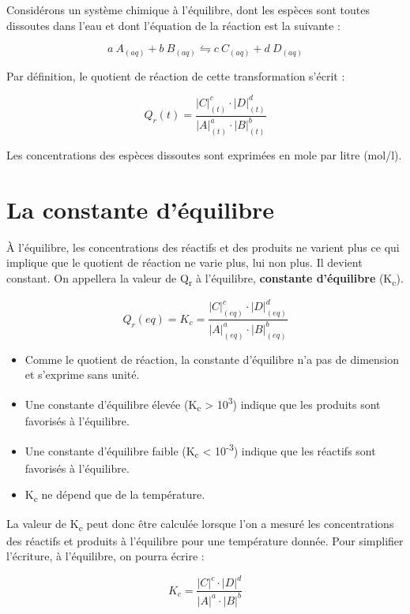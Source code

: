 \documentclass[
  11pt,
  a4paper,
  openany]{book}
\providecommand{\tightlist}{%
  \setlength{\itemsep}{0pt}\setlength{\parskip}{0pt}}
\begin{document}
Considérons un système chimique à l'équilibre, dont les espèces sont toutes dissoutes dans l'eau et dont l'équation de la réaction est la suivante :

\[
  a\ A_{(aq)} + b\ B_{(aq)} \leftrightharpoons c\ C_{(aq)} + d\ D_{(aq)}
\]

Par définition, le quotient de réaction de cette transformation s'écrit :

\[
  Q_{r}(t) = \frac{|C|_{(t)}^{c} \cdot |D|_{(t)}^{d}}{|A|_{(t)}^{a} \cdot |B|_{(t)}^{b}}
\]

Les concentrations des espèces dissoutes sont exprimées en mole par litre (mol/l).

\section{La constante d'équilibre}\label{la-constante-duxe9quilibre}

À l'équilibre, les concentrations des réactifs et des produits ne varient plus ce qui implique que le quotient de réaction ne varie plus, lui non plus. Il devient constant. On appellera la valeur de Q\textsubscript{r} à l'équilibre, \textbf{constante d'équilibre} (K\textsubscript{c}).

\[
  Q_{r}(eq) = K_{c} = \frac{|C|_{(eq)}^{c} \cdot |D|_{(eq)}^{d}}{|A|_{(eq)}^{a} \cdot |B|_{(eq)}^{b}}
\]

\begin{itemize}
\tightlist
\item
  Comme le quotient de réaction, la constante d'équilibre n'a pas de dimension et s'exprime sans unité.
\item
  Une constante d'équilibre élevée (K\textsubscript{c} \textgreater{} 10\textsuperscript{3}) indique que les produits sont favorisés à l'équilibre.
\item
  Une constante d'équilibre faible (K\textsubscript{c} \textless{} 10\textsuperscript{-3}) indique que les réactifs sont favorisés à l'équilibre.
\item
  K\textsubscript{c} ne dépend que de la température.
\end{itemize}

La valeur de K\textsubscript{c} peut donc être calculée lorsque l'on a mesuré les concentrations des réactifs et produits à l'équilibre pour une température donnée. Pour simplifier l'écriture, à l'équilibre, on pourra écrire :

\[
  K_{c} = \frac{|C|^{c} \cdot |D|^{d}}{|A|^{a} \cdot |B|^{b}}
\]
\end{document}
